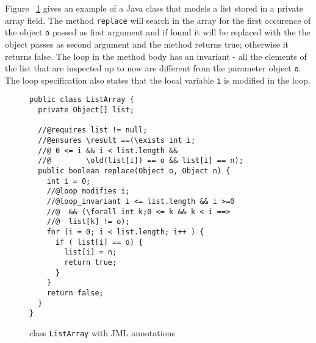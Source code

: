 Figure ~\ref{halfSrc} gives an example of a Java class that models a list stored in a private array field. 
The method \texttt{replace} will search in the array for the first occurence of the object \texttt{o} passed as first argument and if found it will be replaced with the 
the object passes as second argument and the method returns true; otherwise it returns false. The loop in the method body has an invariant - all
the elements of the list that are inspected up to now are different from the parameter object \texttt{o}. The loop specification also states
that the local variable \texttt{i} is modified in the loop.
\begin{figure}[ht!]
\begin{verbatim}
public class ListArray {
  private Object[] list;

  //@requires list != null;
  //@ensures \result ==(\exists int i; 
  //@ 0 <= i && i < list.length && 
  //@        \old(list[i]) == o && list[i] == n); 
  public boolean replace(Object o, Object n) {
    int i = 0;
    //@loop_modifies i;
    //@loop_invariant i <= list.length && i >=0 
    //@  && (\forall int k;0 <= k && k < i ==> 
    //@  list[k] != o); 
    for (i = 0; i < list.length; i++ ) {
      if ( list[i] == o) {
        list[i] = n;
        return true;	
      }
    }
    return false;
  }
}
\end{verbatim}
\caption{class \texttt{ListArray} with JML annotations} 
\label{halfSrc}
\end{figure}


